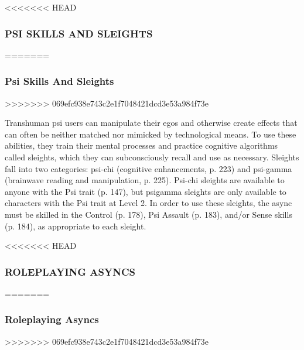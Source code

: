 <<<<<<< HEAD \subsubsection{PSI SKILLS AND SLEIGHTS} ======= \subsubsection{Psi Skills And Sleights} >>>>>>> 069efc938e743c2e1f7048421dcd3e53a984f73e 

Transhuman psi users can manipulate their egos and otherwise create effects that can often be neither matched nor mimicked by technological means. To use these abilities, they train their mental processes and practice cognitive algorithms called sleights, which they can subconsciously recall and use as necessary. Sleights fall into two categories: psi-chi (cognitive enhancements, p. 223) and psi-gamma (brainwave reading and manipulation, p. 225). Psi-chi sleights are available to anyone with the Psi trait (p. 147), but psigamma sleights are only available to characters with the Psi trait at Level 2. In order to use these sleights, the async must be skilled in the Control (p. 178), Psi Assault (p. 183), and/or Sense skills (p. 184), as appropriate to each sleight. 

<<<<<<< HEAD \subsubsection{ROLEPLAYING ASYNCS} ======= \subsubsection{Roleplaying Asyncs} >>>>>>> 069efc938e743c2e1f7048421dcd3e53a984f73e 

